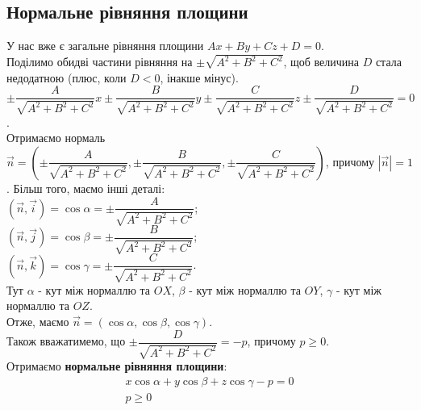 \documentclass[a4paper, 10pt]{extarticle}
\theoremstyle{theoremdd}
\theoremstyle{theoremdd}
\theoremstyle{theoremdd}
\theoremstyle{theoremdd}
\theoremstyle{theoremdd}
\theoremstyle{theoremdd}
\theoremstyle{theoremdd}
\theoremstyle{theoremdd}
\begin{document}
\subsection{Нормальне рівняння площини}
У нас вже є загальне рівняння площини $Ax + By + Cz + D = 0$.\\
Поділимо обидві частини рівняння на $\pm \sqrt{A^2+B^2+C^2}$, щоб величина $D$ стала недодатною (плюс, коли $D<0$, інакше мінус).\\
$\pm \dfrac{A}{\sqrt{A^2+B^2+C^2}}x \pm \dfrac{B}{\sqrt{A^2+B^2+C^2}}y \pm \dfrac{C}{\sqrt{A^2+B^2+C^2}}z \pm \dfrac{D}{\sqrt{A^2+B^2+C^2}} = 0$.\\
Отримаємо нормаль $\vec{n} = \left(\pm \dfrac{A}{\sqrt{A^2+B^2+C^2}}, \pm \dfrac{B}{\sqrt{A^2+B^2+C^2}}, \pm \dfrac{C}{\sqrt{A^2+B^2+C^2}} \right)$, причому $|\vec{n}| = 1$. Більш того, маємо інші деталі:\\
$(\vec{n}, \vec{i}) = \cos \alpha = \pm \dfrac{A}{\sqrt{A^2+B^2+C^2}}$;\\
$(\vec{n}, \vec{j}) = \cos \beta = \pm \dfrac{B}{\sqrt{A^2+B^2+C^2}}$;\\
$(\vec{n}, \vec{k}) = \cos \gamma = \pm \dfrac{C}{\sqrt{A^2+B^2+C^2}}$.\\
Тут $\alpha$ - кут між нормаллю та $OX$, $\beta$ - кут між нормаллю та $OY$, $\gamma$ - кут між нормаллю та $OZ$.\\
Отже, маємо $\vec{n} = (\cos \alpha, \cos \beta, \cos \gamma)$.\\
Також вважатимемо, що $\pm \dfrac{D}{\sqrt{A^2+B^2+C^2}} = -p$, причому $p \geq 0$.\\
Отримаємо \textbf{нормальне рівняння площини}:
\begin{align*}
x \cos \alpha + y \cos \beta + z \cos \gamma - p = 0 \\
p \geq 0
\end{align*}

\begin{figure}[H]
\centering
{}
\end{figure}
\end{document}
